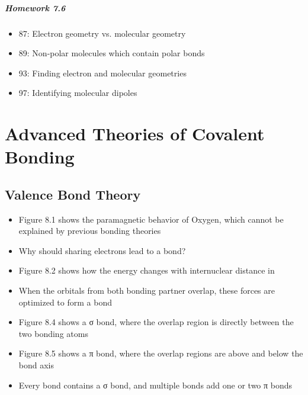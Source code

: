 \documentclass[12pt, openany, letterpaper]{memoir}
\begin{document}
\paragraph*{Homework 7.6}
\begin{itemize}
  \item 87: Electron geometry vs. molecular geometry
  \item 89: Non-polar molecules which contain polar bonds
  \item 93: Finding electron and molecular geometries
  \item 97: Identifying molecular dipoles 
\end{itemize}

\chapter{Advanced Theories of Covalent Bonding}

\section{Valence Bond Theory}
\begin{itemize}
  \item Figure 8.1 shows the paramagnetic behavior of Oxygen, which cannot be explained by previous bonding theories
  \item Why should sharing electrons lead to a bond?
  \item Figure 8.2 shows how the energy changes with internuclear distance in 
  \item When the orbitals from both bonding partner overlap, these forces are optimized to form a bond
  \item Figure 8.4 shows a σ bond, where the overlap region is directly between the two bonding atoms
  \item Figure 8.5 shows a π bond, where the overlap regions are above and below the bond axis
  \item Every bond contains a σ bond, and multiple bonds add one or two π bonds
\end{itemize}
\end{document}
